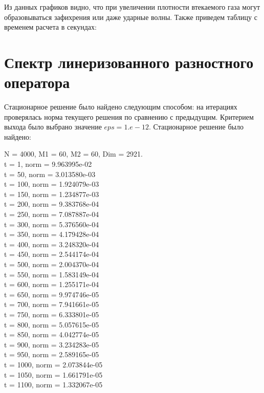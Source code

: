 \documentclass[12pt,a4paper]{article}
\begin{document}




Из данных графиков видно, что при увеличении плотности втекаемого газа могут образовываться зафихрения или даже ударные волны. Также приведем таблицу с временем расчета в секундах:


\section{Спектр линеризованного разностного оператора}
Стационарное решение было найдено следующим способом: на итерациях проверялась норма текущего решения по сравнению с предыдущим. Критерием выхода было выбрано значение $eps = 1.e-12$. Стационарное решение было найдено:
\begin{center}
N = 4000, M1 =  60, M2 =  60, Dim =   2921. \\
t =   1, norm = 9.963995e-02 \\
t =  50, norm = 3.013580e-03 \\
t = 100, norm = 1.924079e-03 \\
t = 150, norm = 1.234877e-03 \\
t = 200, norm = 9.383768e-04 \\
t = 250, norm = 7.087887e-04 \\
t = 300, norm = 5.376560e-04 \\
t = 350, norm = 4.179428e-04 \\
t = 400, norm = 3.248320e-04 \\
t = 450, norm = 2.544174e-04 \\
t = 500, norm = 2.004370e-04 \\
t = 550, norm = 1.583149e-04 \\
t = 600, norm = 1.255171e-04 \\
t = 650, norm = 9.974746e-05 \\
t = 700, norm = 7.941661e-05 \\
t = 750, norm = 6.333801e-05 \\
t = 800, norm = 5.057615e-05 \\
t = 850, norm = 4.042774e-05 \\
t = 900, norm = 3.234283e-05 \\
t = 950, norm = 2.589165e-05 \\
t = 1000, norm = 2.073844e-05 \\
t = 1050, norm = 1.661791e-05 \\
t = 1100, norm = 1.332067e-05 \\

\end{center}
\end{document}
